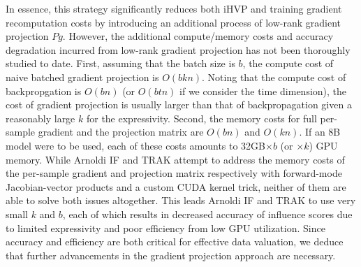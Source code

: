 In essence, this strategy significantly reduces both iHVP and training gradient recomputation costs by introducing an additional process of low-rank gradient projection $Pg$. However, the additional compute/memory costs and accuracy degradation incurred from low-rank gradient projection has not been thoroughly studied to date. First, assuming that the batch size is $b$, the compute cost of naive batched gradient projection is $O(bkn)$. Noting that the compute cost of backpropgation is $O(bn)$ (or $O(btn)$ if we consider the time dimension), the cost of gradient projection is usually larger than that of backpropagation given a reasonably large $k$ for the expressivity. Second, the memory costs for full per-sample gradient and the projection matrix are $O(bn)$ and $O(kn)$. If an 8B model were to be used, each of these costs amounts to 32GB$\times b$ (or $\times k$) GPU memory. While Arnoldi IF and TRAK attempt to address the memory costs of the per-sample gradient and projection matrix respectively with forward-mode Jacobian-vector products and a custom CUDA kernel trick, neither of them are able to solve both issues altogether. This leads Arnoldi IF and TRAK to use very small $k$ and $b$, each of which results in decreased accuracy of influence scores due to limited expressivity and poor efficiency from low GPU utilization. Since accuracy and efficiency are both critical for effective data valuation, we deduce that further advancements in the gradient projection approach are necessary.